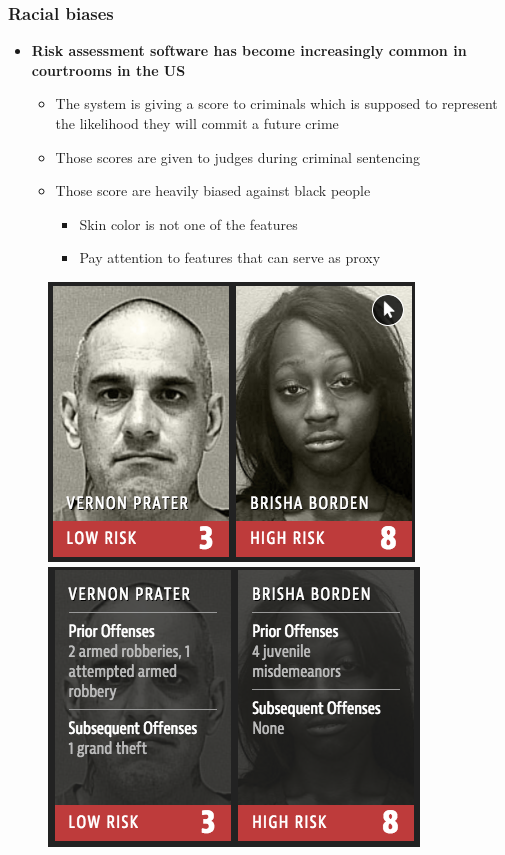 \documentclass{beamer}
\begin{document}
\begin{frame}\frametitle{Racial biases}
\begin{itemize}
	\setlength\itemsep{1em}
	\item {\bf Risk assessment software has become increasingly common in courtrooms in the US}
	\begin{itemize}
		\item The system is giving a score to criminals which is supposed to represent the likelihood they will commit a future crime
		\item Those scores are given to judges during criminal sentencing
		\item Those score are heavily biased against black people
		\begin{itemize}
			\item Skin color is not one of the features
			\item Pay attention to features that can serve as proxy
		\end{itemize}
	\end{itemize}
\end{itemize}
\begin{figure}[h]
	\centering
	\includegraphics[scale=0.33]{./Figures/risk_assessment}
	\includegraphics[scale=0.33]{./Figures/risk_assessment2}
	\label{fig:risk_assessment}
\end{figure}
\end{frame}
\end{document}
